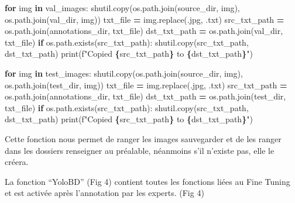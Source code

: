 \documentclass[
  10pt,
]{article}
\newenvironment{Shaded}{\begin{snugshade}}{\end{snugshade}}
\newcommand{\BuiltInTok}[1]{#1}
\newcommand{\ControlFlowTok}[1]{\textcolor[rgb]{0.13,0.29,0.53}{\textbf{#1}}}
\newcommand{\KeywordTok}[1]{\textcolor[rgb]{0.13,0.29,0.53}{\textbf{#1}}}
\newcommand{\NormalTok}[1]{#1}
\newcommand{\OperatorTok}[1]{\textcolor[rgb]{0.81,0.36,0.00}{\textbf{#1}}}
\newcommand{\SpecialCharTok}[1]{\textcolor[rgb]{0.81,0.36,0.00}{\textbf{#1}}}
\newcommand{\SpecialStringTok}[1]{\textcolor[rgb]{0.31,0.60,0.02}{#1}}
\newcommand{\StringTok}[1]{\textcolor[rgb]{0.31,0.60,0.02}{#1}}
\begin{document}
\begin{Shaded}
\begin{Highlighting}[]
    \ControlFlowTok{for}\NormalTok{ img }\KeywordTok{in}\NormalTok{ val\_images:}
\NormalTok{        shutil.copy(os.path.join(source\_dir, img), os.path.join(val\_dir, img))}
\NormalTok{        txt\_file }\OperatorTok{=}\NormalTok{ img.replace(}\StringTok{\textquotesingle{}.jpg\textquotesingle{}}\NormalTok{, }\StringTok{\textquotesingle{}.txt\textquotesingle{}}\NormalTok{)}
\NormalTok{        src\_txt\_path }\OperatorTok{=}\NormalTok{ os.path.join(annotations\_dir, txt\_file)}
\NormalTok{        dst\_txt\_path }\OperatorTok{=}\NormalTok{ os.path.join(val\_dir, txt\_file)}
        \ControlFlowTok{if}\NormalTok{ os.path.exists(src\_txt\_path):}
\NormalTok{            shutil.copy(src\_txt\_path, dst\_txt\_path)}
            \BuiltInTok{print}\NormalTok{(}\SpecialStringTok{f"Copied }\SpecialCharTok{\{}\NormalTok{src\_txt\_path}\SpecialCharTok{\}}\SpecialStringTok{ to }\SpecialCharTok{\{}\NormalTok{dst\_txt\_path}\SpecialCharTok{\}}\SpecialStringTok{"}\NormalTok{)}

    \ControlFlowTok{for}\NormalTok{ img }\KeywordTok{in}\NormalTok{ test\_images:}
\NormalTok{        shutil.copy(os.path.join(source\_dir, img), os.path.join(test\_dir, img))}
\NormalTok{        txt\_file }\OperatorTok{=}\NormalTok{ img.replace(}\StringTok{\textquotesingle{}.jpg\textquotesingle{}}\NormalTok{, }\StringTok{\textquotesingle{}.txt\textquotesingle{}}\NormalTok{)}
\NormalTok{        src\_txt\_path }\OperatorTok{=}\NormalTok{ os.path.join(annotations\_dir, txt\_file)}
\NormalTok{        dst\_txt\_path }\OperatorTok{=}\NormalTok{ os.path.join(test\_dir, txt\_file)}
        \ControlFlowTok{if}\NormalTok{ os.path.exists(src\_txt\_path):}
\NormalTok{            shutil.copy(src\_txt\_path, dst\_txt\_path)}
            \BuiltInTok{print}\NormalTok{(}\SpecialStringTok{f"Copied }\SpecialCharTok{\{}\NormalTok{src\_txt\_path}\SpecialCharTok{\}}\SpecialStringTok{ to }\SpecialCharTok{\{}\NormalTok{dst\_txt\_path}\SpecialCharTok{\}}\SpecialStringTok{"}\NormalTok{)}
\end{Highlighting}
\end{Shaded}

Cette fonction nous permet de ranger les images sauvegarder et de les
ranger dans les dossiers renseigner au préalable, néanmoins s'il
n'existe pas, elle le créera.

La fonction ``YoloBD'' (Fig 4) contient toutes les fonctions liées au
Fine Tuning et est activée après l'annotation par les experts. (Fig 4)
\end{document}
